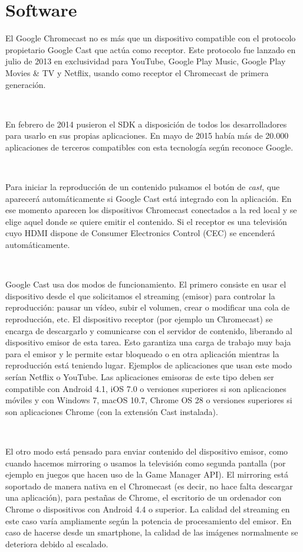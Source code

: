 \section{Software}

El Google Chromecast no es más que un dispositivo compatible con el protocolo propietario Google Cast que actúa como receptor.
Este protocolo fue lanzado en julio de 2013 en exclusividad para YouTube, Google Play Music, Google Play Movies \& TV y Netflix, usando como receptor el Chromecast de primera generación.

\

En febrero de 2014 pusieron el SDK a disposición de todos los desarrolladores para usarlo en sus propias aplicaciones.
En mayo de 2015 había más de 20.000 aplicaciones de terceros compatibles con esta tecnología según reconoce Google.

\

Para iniciar la reproducción de un contenido pulsamos el botón de \textit{cast}, que aparecerá automáticamente si Google Cast está integrado con la aplicación.
En ese momento aparecen los dispositivos Chromecast conectados a la red local y se elige aquel donde se quiere emitir el contenido.
Si el receptor es una televisión cuyo HDMI dispone de Consumer Electronics Control (CEC) se encenderá automáticamente.

\

Google Cast usa dos modos de funcionamiento. El primero consiste en usar el dispositivo desde el que solicitamos el streaming (emisor) para controlar la reproducción: pausar un vídeo, subir el volumen, crear o modificar una cola de reproducción, etc.
El dispositivo receptor (por ejemplo un Chromecast) se encarga de descargarlo y comunicarse con el servidor de contenido, liberando al dispositivo emisor de esta tarea.
Esto garantiza una carga de trabajo muy baja para el emisor y le permite estar bloqueado o en otra aplicación mientras la reproducción está teniendo lugar.
Ejemplos de aplicaciones que usan este modo serían Netflix o YouTube.
Las aplicaciones emisoras de este tipo deben ser compatible con Android 4.1, iOS 7.0 o versiones superiores si son aplicaciones móviles y con Windows 7, macOS 10.7, Chrome OS 28 o versiones superiores si son aplicaciones Chrome (con la extensión Cast instalada).

\

El otro modo está pensado para enviar contenido del dispositivo emisor, como cuando hacemos mirroring o usamos la televisión como segunda pantalla (por ejemplo en juegos que hacen uso de la Game Manager API).
El mirroring está soportado de manera nativa en el Chromecast (es decir, no hace falta descargar una aplicación), para pestañas de Chrome, el escritorio de un ordenador con Chrome o dispositivos con Android 4.4 o superior.
La calidad del streaming en este caso varía ampliamente según la potencia de procesamiento del emisor.
En caso de hacerse desde un smartphone, la calidad de las imágenes normalmente se deteriora debido al escalado.

